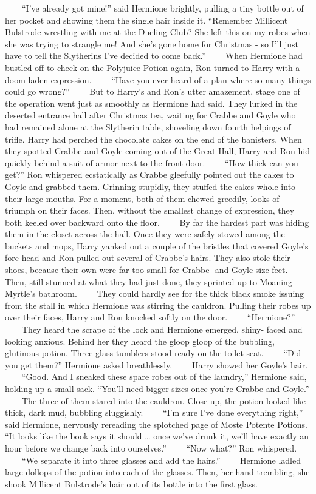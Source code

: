 \documentclass[]{book}
\begin{document}
　　``I've already got mine!'' said Hermione brightly, pulling a tiny
bottle out of her pocket and showing them the single hair inside it.
``Remember Millicent Bulstrode wrestling with me at the Dueling Club?
She left this on my robes when she was trying to strangle me! And she's
gone home for Christmas - so I'll just have to tell the Slytherins I've
decided to come back.'' 　　When Hermione had bustled off to check on
the Polyjuice Potion again, Ron turned to Harry with a doom-laden
expression. 　　``Have you ever heard of a plan where so many things
could go wrong?'' 　　But to Harry's and Ron's utter amazement, stage
one of the operation went just as smoothly as Hermione had said. They
lurked in the deserted entrance hall after Christmas tea, waiting for
Crabbe and Goyle who had remained alone at the Slytherin table,
shoveling down fourth helpings of trifle. Harry had perched the
chocolate cakes on the end of the banisters. When they spotted Crabbe
and Goyle coming out of the Great Hall, Harry and Ron hid quickly behind
a suit of armor next to the front door. 　　``How thick can you get?''
Ron whispered ecstatically as Crabbe gleefully pointed out the cakes to
Goyle and grabbed them. Grinning stupidly, they stuffed the cakes whole
into their large mouths. For a moment, both of them chewed greedily,
looks of triumph on their faces. Then, without the smallest change of
expression, they both keeled over backward onto the floor. 　　By far
the hardest part was hiding them in the closet across the hall. Once
they were safely stowed among the buckets and mops, Harry yanked out a
couple of the bristles that covered Goyle's fore head and Ron pulled out
several of Crabbe's hairs. They also stole their shoes, because their
own were far too small for Crabbe- and Goyle-size feet. Then, still
stunned at what they had just done, they sprinted up to Moaning Myrtle's
bathroom. 　　They could hardly see for the thick black smoke issuing
from the stall in which Hermione was stirring the cauldron. Pulling
their robes up over their faces, Harry and Ron knocked softly on the
door. 　　``Hermione?'' 　　They heard the scrape of the lock and
Hermione emerged, shiny- faced and looking anxious. Behind her they
heard the gloop gloop of the bubbling, glutinous potion. Three glass
tumblers stood ready on the toilet seat. 　　``Did you get them?''
Hermione asked breathlessly. 　　Harry showed her Goyle's hair.
　　``Good. And I sneaked these spare robes out of the laundry,''
Hermione said, holding up a small sack. ``You'll need bigger sizes once
you're Crabbe and Goyle.'' 　　The three of them stared into the
cauldron. Close up, the potion looked like thick, dark mud, bubbling
sluggishly. 　　``I'm sure I've done everything right,'' said Hermione,
nervously rereading the splotched page of Moste Potente Potions. ``It
looks like the book says it should \ldots{} once we've drunk it, we'll
have exactly an hour before we change back into ourselves.'' 　　``Now
what?'' Ron whispered. 　　``We separate it into three glasses and add
the hairs.'' 　　Hermione ladled large dollops of the potion into each
of the glasses. Then, her hand trembling, she shook Millicent
Bulstrode's hair out of its bottle into the first glass.
\end{document}
